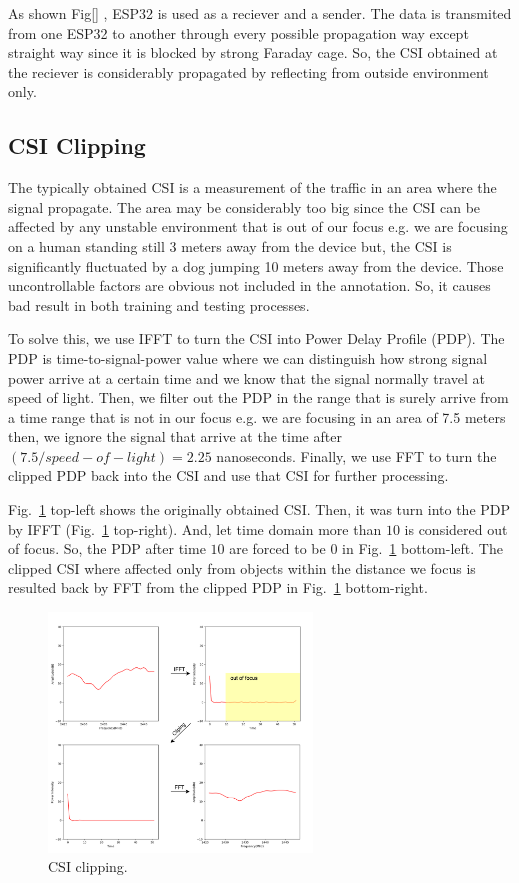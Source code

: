 \documentclass[conference]{IEEEtran}
\begin{document}
	As shown Fig[] , ESP32 is used as a reciever and a sender. The data is transmited from one ESP32   to another through every possible propagation way except straight way since it is blocked by strong Faraday cage. So, the CSI obtained at the reciever is considerably propagated by reflecting from outside environment only.
	
	
	 \subsection{CSI Clipping}
	 
	 The typically obtained CSI is a measurement of the traffic in an area where the signal propagate. The area may be considerably too big since the CSI can be affected by any unstable environment that is out of our focus e.g. we are focusing on a human standing still 3 meters away from the device but, the CSI is significantly fluctuated by a dog jumping 10 meters away from the device. Those uncontrollable factors are obvious not included in the annotation. So, it causes bad result in both training and testing processes. 
	 
	 To solve this, we use IFFT to turn the CSI into Power Delay Profile (PDP). The PDP is time-to-signal-power value where we can distinguish how strong signal power arrive at a certain time and we know that the signal normally travel at speed of light. Then, we filter out the PDP in the range that is surely arrive from a time range that is not in our focus e.g. we are focusing in an area of 7.5 meters then, we ignore the signal that arrive at the time after $(7.5/speed-of-light)= 2.25$ nanoseconds. Finally, we use FFT to turn the clipped PDP back into the CSI and use that CSI for further processing.
	 
	  Fig.~\ref{fig:CSIClipping01} top-left shows the originally obtained CSI. Then, it was turn into the PDP by IFFT (Fig.~\ref{fig:CSIClipping01} top-right). And, let time domain more than $10$ is considered out of focus. So, the PDP after time $10$ are forced to be $0$ in Fig.~\ref{fig:CSIClipping01} bottom-left. The clipped CSI where affected only from objects within the distance we focus is resulted back by FFT from the clipped PDP in Fig.~\ref{fig:CSIClipping01} bottom-right.
	 
	 \begin{figure}[htbp]

	 	\centerline{\includegraphics[width=70mm,scale=0.5]{CSIClipping01.png}}
	 	\caption{CSI clipping.}
	 	\label{fig:CSIClipping01}
	 \end{figure}
	 
\end{document}
